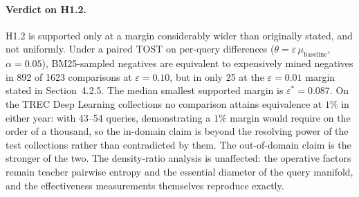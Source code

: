 \paragraph{Verdict on H1.2.} H1.2 is supported only at a margin considerably wider than originally stated, and not uniformly. Under a paired TOST on per-query differences ($\theta = \varepsilon\,\mu_{\text{baseline}}$, $\alpha = 0.05$), BM25-sampled negatives are equivalent to expensively mined negatives in 892 of 1623 comparisons at $\varepsilon = 0.10$, but in only 25 at the $\varepsilon = 0.01$ margin stated in Section~4.2.5. The median smallest supported margin is $\varepsilon^{*} = 0.087$. On the TREC Deep Learning collections no comparison attains equivalence at $1\%$ in either year: with 43--54 queries, demonstrating a $1\%$ margin would require on the order of a thousand, so the in-domain claim is beyond the resolving power of the test collections rather than contradicted by them. The out-of-domain claim is the stronger of the two. The density-ratio analysis is unaffected: the operative factors remain teacher pairwise entropy and the essential diameter of the query manifold, and the effectiveness measurements themselves reproduce exactly.
